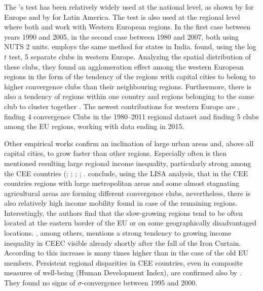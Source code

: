 \documentclass[11pt]{article}
\begin{document}
The \cite{phillips2007transition}'s test
has been relatively widely used at the national level, as shown by \citet{borsi2015evolution, fritsche2011analysing, monfort2013real,apergis2010old} for Europe and by \citet{rodriguez2014there} for Latin America. The test is also used at the regional level where both \citet{bartkowska2012regional} and \citet{pinho2010regional} work with Western European regions. In the first case between years 1990 and 2005, in the second case between 1980 and 2007, both using NUTS 2 units. \citet{ghosh2013regional} employs the same method for states in India. \citet{bartkowska2012regional} found, using the log $t$ test, 5 separate clubs in western Europe. Analyzing the spatial distribution of these clubs, they found an agglomeration effect among the western European regions in the form of the tendency of the regions with capital cities to belong to higher convergence clubs than their neighbouring regions. Furthermore, there is also a tendency of regions within one country and regions belonging to the same club to cluster together \citep{bartkowska2012regional}. The newest contributions for western Europe are \citet{von2017regional}, finding 4 convergence Clubs in the 1980–2011 regional dataset and \citet{cutrini2019economic} finding 5 clubs among the EU regions, working with data ending in 2015. 

Other empirical works confirm an inclination of large urban areas and, above all capital cities, to grow faster than other regions. Especially often is then mentioned resulting large regional income inequality, particularly strong among the CEE countries (\citet{cuaresma2014determinants}; \citet{sme2012regional}; \citet{szendi2013convergence}; \citet{chapman2012income}; \citet{monastiriotis2011regional}. \citet{sme2012regional} conclude, using the LISA analysis, that in the CEE countries regions with large metropolitan areas and some almost stagnating agricultural areas are forming different convergence clubs, nevertheless, there is also relatively high income mobility found in case of the remaining regions. Interestingly, the authors find that the slow-growing regions tend to be often located at the eastern border of the EU or on some geographically disadvantaged locations. \citet{monastiriotis2011regional}, among others, mentions a strong tendency to growing income inequality in CEEC visible already shortly after the fall of the Iron Curtain. According to \citeauthor{monastiriotis2011regional} this increase is many times higher than in the case of the old EU members. Persistent regional disparities in CEE countries, even in composite measures of well-being (Human Development Index), are confirmed also by \citet{benedek2015paths}. They found no signs of $\sigma$-convergence between 1995 and 2000.  
\end{document}
